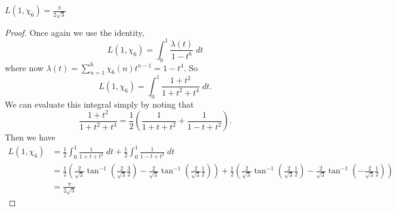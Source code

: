 \documentclass{unswmaths}
\begin{document}
    \begin{theorem}
        $L(1,\chi_6) = \frac{\pi}{2\sqrt{3}}$
    \end{theorem}
    \begin{proof}
        Once again we use the identity,
        \begin{equation*}
            L(1,\chi_6) = \int_0^1 \frac{\lambda(t)}{1-t^6}\;dt
        \end{equation*}
        where now $\lambda(t)= \sum_{n=1}^6 \chi_6(n)t^{n-1} = 1-t^4$. So
        \begin{equation*}
            L(1,\chi_6) = \int_0^1 \frac{1+t^2}{1+t^2+t^4}\;dt.
        \end{equation*}
        We can evaluate this integral simply by noting that
        \begin{equation*}
            \frac{1+t^2}{1+t^2+t^4} = \frac{1}{2}\left(\frac{1}{1+t+t^2}+\frac{1}{1-t+t^2}\right).
        \end{equation*}
        Then we have
        \begin{align*}
            L(1,\chi_6) &= \frac{1}{2}\int_0^1 \frac{1}{1+t+t^2}\;dt+\frac{1}{2}\int_0^1 \frac{1}{1-t+t^2}\;dt\\
            &= \frac{1}{2}(\frac{2}{\sqrt{3}}\tan^{-1}(\frac{2}{\sqrt{3}}\frac{3}{2})-\frac{2}{\sqrt{3}}\tan^{-1}(\frac{2}{\sqrt{3}}\frac{1}{2}))+\frac{1}{2}(\frac{2}{\sqrt{3}}\tan^{-1}(\frac{2}{\sqrt{3}}\frac{1}{2})-\frac{2}{\sqrt{3}}\tan^{-1}(-\frac{2}{\sqrt{3}}\frac{1}{2}))\\
            &= \frac{\pi}{2\sqrt{3}}
        \end{align*}
    \end{proof}
\end{document}
